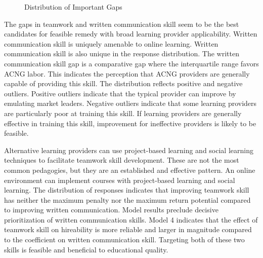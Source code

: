 \documentclass[review]{elsarticle}
\begin{document}
\begin{figure}[h!]
    \centering
    \caption{Distribution of Important Gaps}
    \label{fig:important_gaps}
\end{figure}

The gaps in teamwork and written communication skill seem to be the best candidates for
feasible remedy with broad learning provider applicability.
Written communication skill is uniquely amenable to online learning.
Written communication skill is also unique in the response distribution.
The written communication skill gap is a comparative gap where the interquartile range favors ACNG labor.
This indicates the perception that ACNG providers are generally capable of providing this skill.
The distribution reflects positive and negative outliers.
Positive outliers indicate that the typical provider can improve by emulating market leaders.
Negative outliers indicate that some learning providers are particularly poor at training this skill.
If learning providers are generally effective in training this skill,
improvement for ineffective providers is likely to be feasible.

Alternative learning providers can use project-based learning and social learning
techniques to facilitate teamwork skill development.
These are not the most common pedagogies, but they are an established and effective pattern.
An online environment can implement courses with project-based learning and social learning.
The distribution of responses indicates that improving teamwork skill has neither the maximum
penalty nor the maximum return potential compared to improving written communication.
Model results preclude decisive prioritization of written communication skills.
Model 4 indicates that the effect of teamwork skill on hireability is more reliable
and larger in magnitude compared to the coefficient on written communication skill.
Targeting both of these two skills is feasible and beneficial to educational quality.
\end{document}
